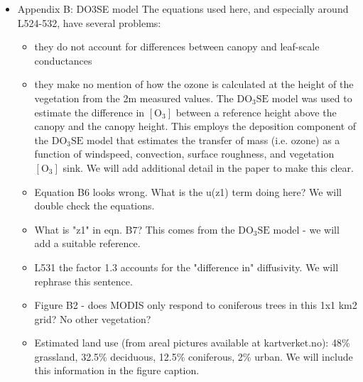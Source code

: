 \documentclass{scrartcl}
\begin{document}
\begin{itemize}
\item {\color{blue}Appendix B: DO3SE model
The equations used here, and especially around L524-532, have several problems:
\begin{itemize}
\item they do not account for differences between canopy and leaf-scale conductances
\item they make no mention of how the ozone is calculated at the height of the vegetation from the 2m measured values.
{\color{black}The $\mathrm{DO_3SE}$ model was used to estimate the difference in $[\mathrm{O_3}]$ between a reference height above the canopy and the canopy height. This employs the deposition component of the $\mathrm{DO_3SE}$ model that estimates the transfer of mass (i.e. ozone) as a function of windspeed, convection, surface roughness, and vegetation $[\mathrm{O_3}]$ sink. We will add additional detail in the paper to make this clear.}
\item Equation B6 looks wrong. What is the u(z1) term doing here?
{\color{black}We will double check the equations.}
\item What is "z1" in eqn. B7?
{\color{black}This comes from the $\mathrm{DO_3SE}$ model - we will add a suitable reference.}
\item L531 the factor 1.3 accounts for the "difference in" diffusivity.
{\color{black}We will rephrase this sentence.}
\item Figure B2 - does MODIS only respond to coniferous trees in this 1x1 km2 grid? No other vegetation?
\item  {\color{black}Estimated land use (from areal pictures available at kartverket.no): 48\% grassland, 32.5\% deciduous, 12.5\% coniferous, 2\% urban. We will include this information in the figure caption.}
\end{itemize}}
  

\end{itemize}
\end{document}
